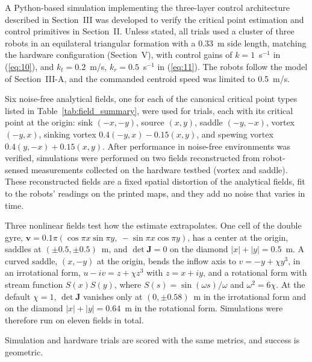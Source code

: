 \documentclass[lettersize,journal]{IEEEtran}
\begin{document}
A Python-based simulation implementing the three-layer control architecture described in Section~III was developed to verify the critical point estimation and control primitives in Section~II. Unless stated, all trials used a cluster of three robots in an equilateral triangular formation with a 0.33~m side length, matching the hardware configuration (Section~V), with control gains of $k = 1$~s$^{-1}$ in (\ref{eq:10}), and $k_t = 0.2$~m/s, $k_r = 0.5$~s$^{-1}$ in (\ref{eq:11}). The robots follow the model of Section~III-A, and the commanded centroid speed was limited to 0.5~m/s.

Six noise-free analytical fields, one for each of the canonical critical point types listed in Table~\ref{tab:field_summary}, were used for trials, each with its critical point at the origin: sink $(-x,-y)$, source $(x,y)$, saddle $(-y,-x)$, vortex $(-y,x)$, sinking vortex $0.4(-y,x)-0.15(x,y)$, and spewing vortex $0.4(y,-x)+0.15(x,y)$. After performance in noise-free environments was verified, simulations were performed on two fields reconstructed from robot-sensed measurements collected on the hardware testbed (vortex and saddle). These reconstructed fields are a fixed spatial distortion of the analytical fields, fit to the robots' readings on the printed maps, and they add no noise that varies in time.

Three nonlinear fields test how the estimate extrapolates. One cell of the double gyre, $\mathbf{v} = 0.1\pi(\cos\pi x \sin\pi y,\allowbreak\ -\sin\pi x \cos\pi y)$, has a center at the origin, saddles at $(\pm 0.5, \pm 0.5)$~m, and $\det\mathbf{J} = 0$ on the diamond $|x| + |y| = 0.5$~m. A curved saddle, $(x, -y)$ at the origin, bends the inflow axis to $v = -y + \chi y^3$, in an irrotational form, $u - iv = z + \chi z^3$ with $z = x + iy$, and a rotational form with stream function $S(x)S(y)$, where $S(s) = \sin(\omega s)/\omega$ and $\omega^2 = 6\chi$. At the default $\chi = 1$, $\det\mathbf{J}$ vanishes only at $(0, \pm 0.58)$~m in the irrotational form and on the diamond $|x| + |y| = 0.64$~m in the rotational form. Simulations were therefore run on eleven fields in total.

Simulation and hardware trials are scored with the same metrics, and success is geometric.
\end{document}
